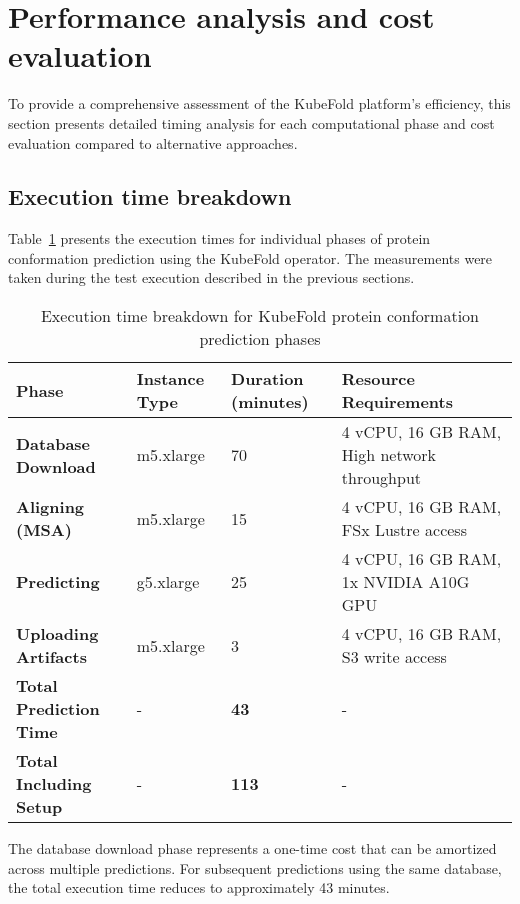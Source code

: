 \section{Performance analysis and cost evaluation}

To provide a comprehensive assessment of the KubeFold platform's efficiency, this section presents detailed timing analysis for each computational phase and cost evaluation compared to alternative approaches.

\subsection{Execution time breakdown}

Table~\ref{tab:phase_timing} presents the execution times for individual phases of protein conformation prediction using the KubeFold operator. The measurements were taken during the test execution described in the previous sections.

\begin{table}[H]
    \centering
    \small
    \begin{tabularx}{\textwidth}{|X|X|X|X|}
        \hline
        \textbf{Phase} & \textbf{Instance Type} & \textbf{Duration (minutes)} & \textbf{Resource Requirements} \\
        \hline
        \textbf{Database Download} & m5.xlarge & 70 & 4 vCPU, 16 GB RAM, High network throughput \\
        \hline
        \textbf{Aligning (MSA)} & m5.xlarge & 15 & 4 vCPU, 16 GB RAM, FSx Lustre access \\
        \hline
        \textbf{Predicting} & g5.xlarge & 25 & 4 vCPU, 16 GB RAM, 1x NVIDIA A10G GPU \\
        \hline
        \textbf{Uploading Artifacts} & m5.xlarge & 3 & 4 vCPU, 16 GB RAM, S3 write access \\
        \hline
        \textbf{Total Prediction Time} & - & \textbf{43} & - \\
        \hline
        \textbf{Total Including Setup} & - & \textbf{113} & - \\
        \hline
    \end{tabularx}
    \caption{Execution time breakdown for KubeFold protein conformation prediction phases}
    \label{tab:phase_timing}
\end{table}

The database download phase represents a one-time cost that can be amortized across multiple predictions. For subsequent predictions using the same database, the total execution time reduces to approximately 43 minutes.

